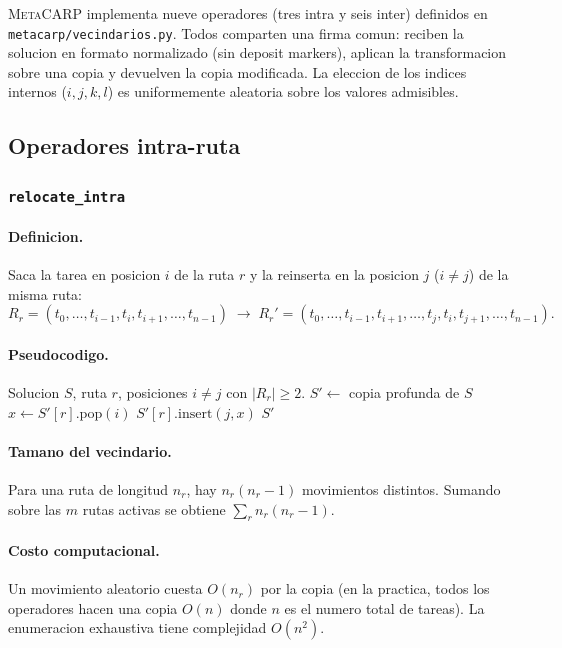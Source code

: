 \documentclass[11pt,a4paper]{article}
\newcommand{\op}[1]{\texttt{#1}}
\newcommand{\code}[1]{\texttt{#1}}
\begin{document}
\textsc{MetaCARP} implementa nueve operadores (tres intra y seis
inter) definidos en \code{metacarp/vecindarios.py}. Todos comparten
una firma comun: reciben la solucion en formato normalizado (sin
deposit markers), aplican la transformacion sobre una copia y
devuelven la copia modificada. La eleccion de los indices internos
($i,j,k,l$) es uniformemente aleatoria sobre los valores admisibles.

\subsection{Operadores intra-ruta}

\subsubsection{\op{relocate\_intra}}

\paragraph{Definicion.} Saca la tarea en posicion $i$ de la ruta $r$
y la reinserta en la posicion $j$ ($i\neq j$) de la misma ruta:
\[
R_r = (t_0,\dots,t_{i-1},t_i,t_{i+1},\dots,t_{n-1})
\;\longrightarrow\;
R_r' = (t_0,\dots,t_{i-1},t_{i+1},\dots,t_j,t_i,t_{j+1},\dots,t_{n-1}).
\]

\paragraph{Pseudocodigo.}
\begin{algorithm}[H]
\caption{\op{relocate\_intra}($S, r, i, j$)}
\begin{algorithmic}[1]
\Require Solucion $S$, ruta $r$, posiciones $i\neq j$ con $|R_r|\ge 2$.
\State $S' \gets$ copia profunda de $S$
\State $x \gets S'[r].\text{pop}(i)$
\State $S'[r].\text{insert}(j, x)$
\State \Return $S'$
\end{algorithmic}
\end{algorithm}

\paragraph{Tamano del vecindario.} Para una ruta de longitud $n_r$,
hay $n_r(n_r-1)$ movimientos distintos. Sumando sobre las $m$ rutas
activas se obtiene $\sum_r n_r(n_r-1)$.

\paragraph{Costo computacional.} Un movimiento aleatorio cuesta
$O(n_r)$ por la copia (en la practica, todos los operadores hacen una
copia $O(n)$ donde $n$ es el numero total de tareas). La enumeracion
exhaustiva tiene complejidad $O(n^2)$.
\end{document}
